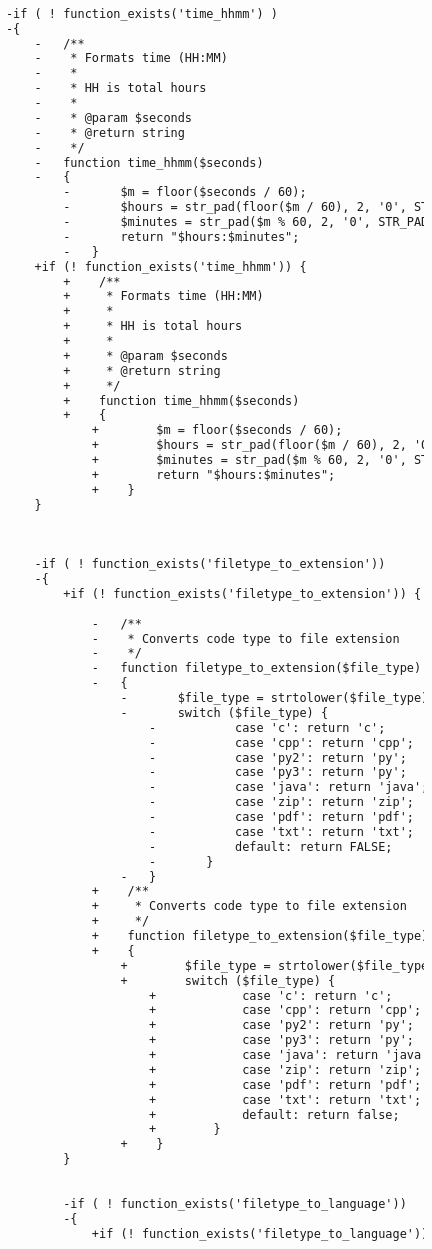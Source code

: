 \begin{lstlisting}[language=diff, caption=Perubahan pada kode shj\_helper.php]
			
			
			-if ( ! function_exists('time_hhmm') )
			-{
				-	/**
				-	 * Formats time (HH:MM)
				-	 *
				-	 * HH is total hours
				-	 *
				-	 * @param $seconds
				-	 * @return string
				-	 */
				-	function time_hhmm($seconds)
				-	{
					-		$m = floor($seconds / 60);
					-		$hours = str_pad(floor($m / 60), 2, '0', STR_PAD_LEFT);
					-		$minutes = str_pad($m % 60, 2, '0', STR_PAD_LEFT);
					-		return "$hours:$minutes";
					-	}
				+if (! function_exists('time_hhmm')) {
					+    /**
					+     * Formats time (HH:MM)
					+     *
					+     * HH is total hours
					+     *
					+     * @param $seconds
					+     * @return string
					+     */
					+    function time_hhmm($seconds)
					+    {
						+        $m = floor($seconds / 60);
						+        $hours = str_pad(floor($m / 60), 2, '0', STR_PAD_LEFT);
						+        $minutes = str_pad($m % 60, 2, '0', STR_PAD_LEFT);
						+        return "$hours:$minutes";
						+    }
				}
				
				
				
				-if ( ! function_exists('filetype_to_extension'))
				-{
					+if (! function_exists('filetype_to_extension')) {
						
						-	/**
						-	 * Converts code type to file extension
						-	 */
						-	function filetype_to_extension($file_type)
						-	{
							-		$file_type = strtolower($file_type);
							-		switch ($file_type) {
								-			case 'c': return 'c';
								-			case 'cpp': return 'cpp';
								-			case 'py2': return 'py';
								-			case 'py3': return 'py';
								-			case 'java': return 'java';
								-			case 'zip': return 'zip';
								-			case 'pdf': return 'pdf';
								-			case 'txt': return 'txt';
								-			default: return FALSE;
								-		}
							-	}
						+    /**
						+     * Converts code type to file extension
						+     */
						+    function filetype_to_extension($file_type)
						+    {
							+        $file_type = strtolower($file_type);
							+        switch ($file_type) {
								+            case 'c': return 'c';
								+            case 'cpp': return 'cpp';
								+            case 'py2': return 'py';
								+            case 'py3': return 'py';
								+            case 'java': return 'java';
								+            case 'zip': return 'zip';
								+            case 'pdf': return 'pdf';
								+            case 'txt': return 'txt';
								+            default: return false;
								+        }
							+    }
					}
					
					
					-if ( ! function_exists('filetype_to_language'))
					-{
						+if (! function_exists('filetype_to_language')) {
							

\end{lstlisting}
